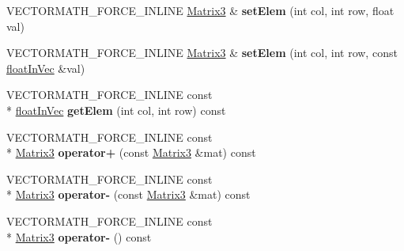 \begin{DoxyCompactItemize}
\item 
\hypertarget{class_vectormath_1_1_aos_1_1_matrix3_a89e00faa17e4db55404b11de366862d6}{V\+E\+C\+T\+O\+R\+M\+A\+T\+H\+\_\+\+F\+O\+R\+C\+E\+\_\+\+I\+N\+L\+I\+N\+E \hyperlink{class_vectormath_1_1_aos_1_1_matrix3}{Matrix3} \& {\bfseries set\+Elem} (int col, int row, float val)}\label{class_vectormath_1_1_aos_1_1_matrix3_a89e00faa17e4db55404b11de366862d6}

\item 
\hypertarget{class_vectormath_1_1_aos_1_1_matrix3_adc91303151f2058aed8fa32517d74a59}{V\+E\+C\+T\+O\+R\+M\+A\+T\+H\+\_\+\+F\+O\+R\+C\+E\+\_\+\+I\+N\+L\+I\+N\+E \hyperlink{class_vectormath_1_1_aos_1_1_matrix3}{Matrix3} \& {\bfseries set\+Elem} (int col, int row, const \hyperlink{class_vectormath_1_1float_in_vec}{float\+In\+Vec} \&val)}\label{class_vectormath_1_1_aos_1_1_matrix3_adc91303151f2058aed8fa32517d74a59}

\item 
\hypertarget{class_vectormath_1_1_aos_1_1_matrix3_ab0041712cc661a226bb8f52d5d276baa}{V\+E\+C\+T\+O\+R\+M\+A\+T\+H\+\_\+\+F\+O\+R\+C\+E\+\_\+\+I\+N\+L\+I\+N\+E const \\*
\hyperlink{class_vectormath_1_1float_in_vec}{float\+In\+Vec} {\bfseries get\+Elem} (int col, int row) const }\label{class_vectormath_1_1_aos_1_1_matrix3_ab0041712cc661a226bb8f52d5d276baa}

\item 
\hypertarget{class_vectormath_1_1_aos_1_1_matrix3_a1429edf9e21b05e01fa778c3bee11a65}{V\+E\+C\+T\+O\+R\+M\+A\+T\+H\+\_\+\+F\+O\+R\+C\+E\+\_\+\+I\+N\+L\+I\+N\+E const \\*
\hyperlink{class_vectormath_1_1_aos_1_1_matrix3}{Matrix3} {\bfseries operator+} (const \hyperlink{class_vectormath_1_1_aos_1_1_matrix3}{Matrix3} \&mat) const }\label{class_vectormath_1_1_aos_1_1_matrix3_a1429edf9e21b05e01fa778c3bee11a65}

\item 
\hypertarget{class_vectormath_1_1_aos_1_1_matrix3_a0d2ab3f5f581a8c8a3c05e4e5fdb6344}{V\+E\+C\+T\+O\+R\+M\+A\+T\+H\+\_\+\+F\+O\+R\+C\+E\+\_\+\+I\+N\+L\+I\+N\+E const \\*
\hyperlink{class_vectormath_1_1_aos_1_1_matrix3}{Matrix3} {\bfseries operator-\/} (const \hyperlink{class_vectormath_1_1_aos_1_1_matrix3}{Matrix3} \&mat) const }\label{class_vectormath_1_1_aos_1_1_matrix3_a0d2ab3f5f581a8c8a3c05e4e5fdb6344}

\item 
\hypertarget{class_vectormath_1_1_aos_1_1_matrix3_ac6f4b7a3a78d4ede00bc7a237d93bff2}{V\+E\+C\+T\+O\+R\+M\+A\+T\+H\+\_\+\+F\+O\+R\+C\+E\+\_\+\+I\+N\+L\+I\+N\+E const \\*
\hyperlink{class_vectormath_1_1_aos_1_1_matrix3}{Matrix3} {\bfseries operator-\/} () const }\label{class_vectormath_1_1_aos_1_1_matrix3_ac6f4b7a3a78d4ede00bc7a237d93bff2}


\end{DoxyCompactItemize}
